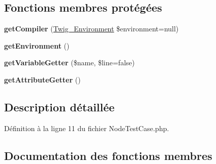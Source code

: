 \subsection*{Fonctions membres protégées}
\begin{DoxyCompactItemize}
\item 
{\bfseries get\+Compiler} (\hyperlink{class_twig___environment}{Twig\+\_\+\+Environment} \$environment=null)\hypertarget{class_twig___test___node_test_case_af479585af9da7b473d14a06892ac0858}{}\label{class_twig___test___node_test_case_af479585af9da7b473d14a06892ac0858}

\item 
{\bfseries get\+Environment} ()\hypertarget{class_twig___test___node_test_case_a1a945689f9a90f9029d671ec32262d37}{}\label{class_twig___test___node_test_case_a1a945689f9a90f9029d671ec32262d37}

\item 
{\bfseries get\+Variable\+Getter} (\$name, \$line=false)\hypertarget{class_twig___test___node_test_case_af79fd21776bb5a9a493bf95960e9a545}{}\label{class_twig___test___node_test_case_af79fd21776bb5a9a493bf95960e9a545}

\item 
{\bfseries get\+Attribute\+Getter} ()\hypertarget{class_twig___test___node_test_case_a45c597a08206da3dd0fa889f8521f1aa}{}\label{class_twig___test___node_test_case_a45c597a08206da3dd0fa889f8521f1aa}

\end{DoxyCompactItemize}


\subsection{Description détaillée}


Définition à la ligne 11 du fichier Node\+Test\+Case.\+php.



\subsection{Documentation des fonctions membres}
